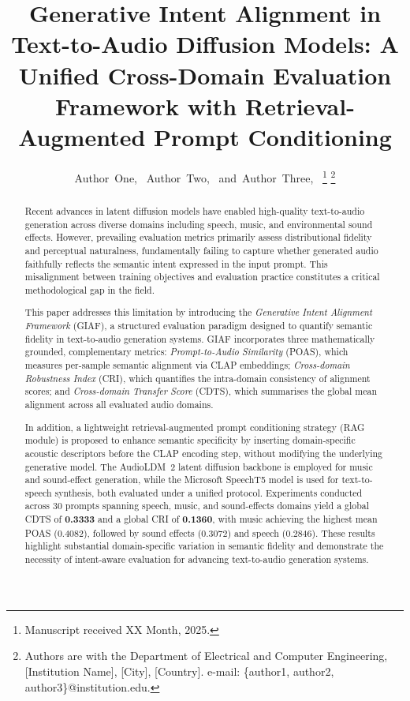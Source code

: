 \documentclass[journal]{IEEEtran}
\title{Generative Intent Alignment in Text-to-Audio Diffusion Models:
A Unified Cross-Domain Evaluation Framework with Retrieval-Augmented Prompt Conditioning}
\author{Author~One,~\IEEEmembership{Student Member,~IEEE,}
        Author~Two,~\IEEEmembership{Member,~IEEE,}
        and~Author~Three,~\IEEEmembership{Senior Member,~IEEE}%
\thanks{Manuscript received XX Month, 2025.}%
\thanks{Authors are with the Department of Electrical and Computer
Engineering, [Institution Name], [City], [Country].
e-mail: \{author1, author2, author3\}@institution.edu.}}
\begin{document}
\maketitle

\begin{abstract}
Recent advances in latent diffusion models have enabled high-quality
text-to-audio generation across diverse domains including speech, music,
and environmental sound effects. However, prevailing evaluation metrics
primarily assess distributional fidelity and perceptual naturalness,
fundamentally failing to capture whether generated audio faithfully
reflects the semantic intent expressed in the input prompt. This
misalignment between training objectives and evaluation practice
constitutes a critical methodological gap in the field.

This paper addresses this limitation by introducing the
\textit{Generative Intent Alignment Framework} (GIAF), a structured
evaluation paradigm designed to quantify semantic fidelity in
text-to-audio generation systems. GIAF incorporates three
mathematically grounded, complementary metrics: \textit{Prompt-to-Audio
Similarity} (POAS), which measures per-sample semantic alignment via
CLAP embeddings; \textit{Cross-domain Robustness Index} (CRI), which
quantifies the intra-domain consistency of alignment scores; and
\textit{Cross-domain Transfer Score} (CDTS), which summarises
the global mean alignment across all evaluated audio domains.

In addition, a lightweight retrieval-augmented prompt conditioning
strategy (RAG module) is proposed to enhance semantic specificity by
inserting domain-specific acoustic descriptors before the CLAP encoding
step, without modifying the underlying generative model. The AudioLDM~2
latent diffusion backbone is employed for music and sound-effect
generation, while the Microsoft SpeechT5 model is used for
text-to-speech synthesis, both evaluated under a unified protocol.
Experiments conducted across 30 prompts spanning speech, music, and
sound-effects domains yield a global CDTS of \textbf{0.3333} and a
global CRI of \textbf{0.1360}, with music achieving the highest
mean POAS (0.4082), followed by sound effects (0.3072) and speech
(0.2846). These results highlight substantial domain-specific variation
in semantic fidelity and demonstrate the necessity of intent-aware
evaluation for advancing text-to-audio generation systems.
\end{abstract}
\end{document}
